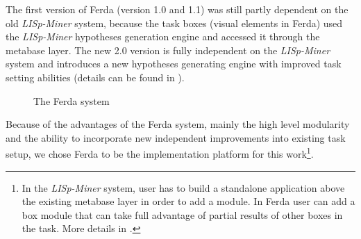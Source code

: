 \documentclass{llncs}
\begin{document}
The first version of Ferda (version 1.0 and 1.1) was still partly
dependent on the old \emph{LISp-Miner} system, because the task boxes
(visual elements in Ferda) used the \emph{LISp-Miner} hypotheses generation
engine and accessed it through the metabase layer. The new 2.0 version
is fully independent on the \emph{LISp-Miner} system and introduces a new
hypotheses generating engine with improved task setting abilities (details
can be found in \cite{Kuchar}). 

\begin{figure}[ht]
\centering
\mbox{}
\caption{The Ferda system}
\label{fig:ferda}
\end{figure}

Because of the advantages of the Ferda system, mainly the high level modularity
and the ability to incorporate new independent improvements into existing task
setup, we chose Ferda to be the implementation platform for this 
work\footnote{In the \emph{LISp-Miner} system, user has to build a standalone 
application above the existing metabase layer in order to add a module. In Ferda
user can add a box module that can take full advantage of partial results of
other boxes in the task. More details in \cite{Ferda}.}.
\end{document}
